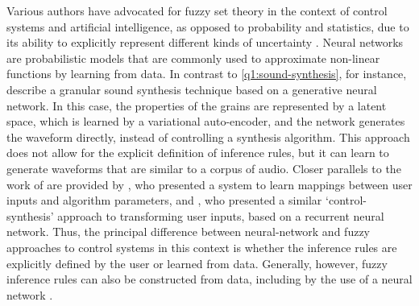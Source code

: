 Various authors have advocated for fuzzy set theory in the context of control systems
and artificial intelligence, as opposed to probability and statistics, due to its
ability to explicitly represent different kinds of uncertainty
\parencite[249]{Laviolette1995}.
Neural networks are probabilistic models that are commonly used to approximate
non-linear functions by learning from data.
In contrast to \cref{q1:sound-synthesis}, for instance, \textcite{Bitton2020} describe
a granular sound synthesis technique based on a generative neural network.
In this case, the properties of the grains are represented by a latent space, which is
learned by a variational auto-encoder, and the network generates the waveform directly,
instead of controlling a synthesis algorithm.
This approach does not allow for the explicit definition of inference rules, but it can
learn to generate waveforms that are similar to a corpus of audio.
Closer parallels to the work of \textcite{Cadiz2020} are provided by
\textcite{Fiebrink2009}, who presented a system to learn mappings between user inputs
and algorithm parameters, and \textcite{Jonason2020}, who presented a similar
`control-synthesis' approach to transforming user inputs, based on a recurrent neural
network.
Thus, the principal difference between neural-network and fuzzy approaches to control
systems in this context is whether the inference rules are explicitly defined by the
user or learned from data.
Generally, however, fuzzy inference rules can also be constructed from data, including
by the use of a neural network \parencite[281,295-296]{Klir1995}.
